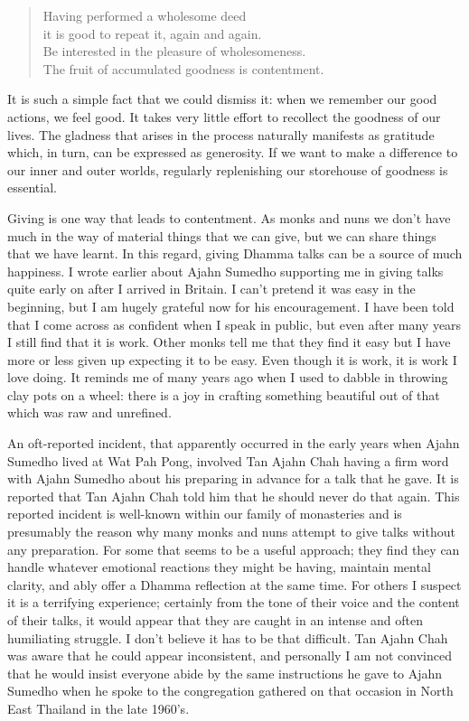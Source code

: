 \begin{quote}
  Having performed a wholesome deed\\
  it is good to repeat it, again and again.\\
  Be interested in the pleasure of wholesomeness.\\
  The fruit of accumulated goodness is contentment.
\end{quote}

It is such a simple fact that we could dismiss it: when we remember our
good actions, we feel good. It takes very little effort to recollect the
goodness of our lives. The gladness that arises in the process naturally
manifests as gratitude which, in turn, can be expressed as generosity.
If we want to make a difference to our inner and outer worlds, regularly
replenishing our storehouse of goodness is essential.

Giving is one way that leads to contentment. As monks and nuns we don't
have much in the way of material things that we can give, but we can
share things that we have learnt. In this regard, giving Dhamma talks
can be a source of much happiness. I wrote earlier about Ajahn Sumedho
supporting me in giving talks quite early on after I arrived in Britain.
I can't pretend it was easy in the beginning, but I am hugely grateful
now for his encouragement. I have been told that I come across as
confident when I speak in public, but even after many years I still find
that it is work. Other monks tell me that they find it easy but I have
more or less given up expecting it to be easy. Even though it is work,
it is work I love doing. It reminds me of many years ago when I used to
dabble in throwing clay pots on a wheel: there is a joy in crafting
something beautiful out of that which was raw and unrefined.

An oft-reported incident, that apparently occurred in the early years
when Ajahn Sumedho lived at Wat Pah Pong, involved Tan Ajahn Chah having
a firm word with Ajahn Sumedho about his preparing in advance for a talk
that he gave. It is reported that Tan Ajahn Chah told him that he should
never do that again. This reported incident is well-known within our family of
monasteries and is presumably the reason why many monks and nuns attempt
to give talks without any preparation. For some that seems to be a
useful approach; they find they can handle whatever emotional reactions
they might be having, maintain mental clarity, and ably offer a Dhamma
reflection at the same time. For others I suspect it is a terrifying
experience; certainly from the tone of their voice and the content of
their talks, it would appear that they are caught in an intense and
often humiliating struggle. I don't believe it has to be that difficult.
Tan Ajahn Chah was aware that he could appear inconsistent, and
personally I am not convinced that he would insist everyone abide by the
same instructions he gave to Ajahn Sumedho when he spoke to the congregation
gathered on that occasion in North East Thailand in the late 1960's.

